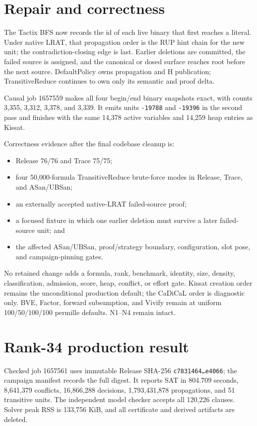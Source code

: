 \documentclass[11pt]{article}
\newcommand{\code}[1]{\texttt{#1}}
\begin{document}
\section{Repair and correctness}

The Tactix BFS now records the id of each live binary that first reaches a
literal.  Under native LRAT, that propagation order is the RUP hint chain for
the new unit; the contradiction-closing edge is last.  Earlier deletions are
committed, the failed source is assigned, and the canonical or dosed surface
reaches root before the next source.  DefaultPolicy owns propagation and H
publication; TransitiveReduce continues to own only its semantic and proof
delta.

Causal job 1657559 makes all four begin/end binary snapshots exact, with counts
3,355, 3,312, 3,378, and 3,339.  It emits units \code{-19788} and
\code{-19396} in the second pass and finishes with the same 14,378 active
variables and 14,259 heap entries as Kissat.

Correctness evidence after the final codebase cleanup is:

\begin{itemize}
\item Release 76/76 and Trace 75/75;
\item four 50,000-formula TransitiveReduce brute-force modes in Release,
  Trace, and ASan/UBSan;
\item an externally accepted native-LRAT failed-source proof;
\item a focused fixture in which one earlier deletion must survive a later
  failed-source unit; and
\item the affected ASan/UBSan, proof/strategy boundary, configuration, slot
  pose, and campaign-pinning gates.
\end{itemize}

No retained change adds a formula, rank, benchmark, identity, size, density,
classification, admission, score, heap, conflict, or effort gate.  Kissat
creation order remains the unconditional production default; the CaDiCaL order
is diagnostic only.  BVE, Factor, forward subsumption, and Vivify remain at
uniform 100/50/100/100 permille defaults.  N1--N4 remain intact.

\section{Rank-34 production result}

Checked job 1657561 uses immutable Release SHA-256
\code{c7831464\ldots e4066}; the campaign manifest records the full digest.
It reports SAT in 804.709 seconds, 8,641,379 conflicts, 16,866,288 decisions,
1,793,431,878 propagations, and 51 transitive units.  The independent model
checker accepts all 120,226 clauses.  Solver peak RSS is 133,756 KiB, and all
certificate and derived artifacts are deleted.
\end{document}

